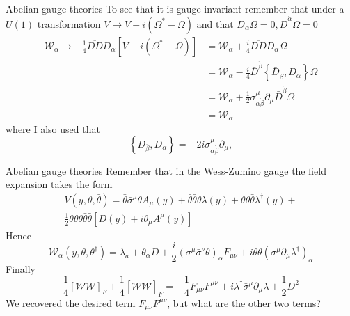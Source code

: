 \documentclass[10pt]{beamer}
\begin{document}
\begin{frame}{Abelian gauge theories}
To see that it is gauge invariant remember that under a $U(1)$ transformation $V \to V + i\left(\Omega^* - \Omega\right)$ and that 
$D_\alpha \Omega = 0, \bar D^{\dot \alpha} \Omega = 0$
\begin{equation*}
\begin{aligned}
    \mathcal{W}_{\alpha} \rightarrow-\frac{1}{4} \overline{D D} D_{\alpha}\left[V+i\left(\Omega^{*}-\Omega\right)\right] &=\mathcal{W}_{\alpha}+\frac{i}{4} \overline{D D} D_{\alpha} \Omega \\
    &=\mathcal{W}_{\alpha}-\frac{i}{4} \bar{D}^{\dot{\beta}}\left\{\bar{D}_{\dot{\beta}}, D_{\alpha}\right\} \Omega \\
    &=\mathcal{W}_{\alpha}+\frac{1}{2} \sigma_{\alpha \dot{\beta}}^{\mu} \partial_{\mu} \bar{D}^{\dot{\beta}} \Omega \\
    &=\mathcal{W}_{\alpha}
\end{aligned}
\end{equation*}
where I also used that 
\begin{equation*}
    \left\{\bar{D}_{\bar\beta}, D_{\alpha}\right\}= - 2 i \sigma_{\alpha \dot{\beta}}^{\mu} \partial_{\mu},
\end{equation*}
\end{frame}

\begin{frame}{Abelian gauge theories}
Remember that in the Wess-Zumino gauge the field expansion takes the form 
\begin{gather*}
    V(y, \theta, \bar \theta) = \bar\theta \bar{\sigma}^{\mu} \theta A_{\mu}(y)+\bar\theta \bar\theta \theta \lambda(y)+\theta \theta \bar\theta \lambda^{\dagger}(y) + \\ 
    \frac{1}{2} \theta \theta \theta \bar\theta \bar\theta\left[D(y)+i \theta_{\mu} A^{\mu}(y)\right]
\end{gather*}
Hence 
\begin{equation*}
    \mathcal{W}_{\alpha}\left(y, \theta, \theta^{\dagger}\right)=\lambda_{a}+\theta_{\alpha} D+\frac{i}{2}\left(\sigma^{\mu} \bar{\sigma}^{\nu} \theta\right)_{\alpha} F_{\mu \nu}+i \theta \theta\left(\sigma^{\mu} \partial_{\mu} \lambda^{\dagger}\right)_{\alpha}
\end{equation*}
Finally 
\begin{equation*}
    \frac{1}{4}\left[\mathcal{WW}\right]_F + \frac{1}{4} \left[\overline{\mathcal{WW}}\right]_F = -\frac{1}{4} F_{\mu\nu} F^{\mu\nu} + i \lambda^{\dagger} \bar\sigma^{\mu} \partial_{\mu} \lambda + \frac{1}{2} D^2
\end{equation*}
We recovered the desired term $F_{\mu\nu}F^{\mu\nu}$, but what are the other two terms?
\end{frame}
\end{document}
